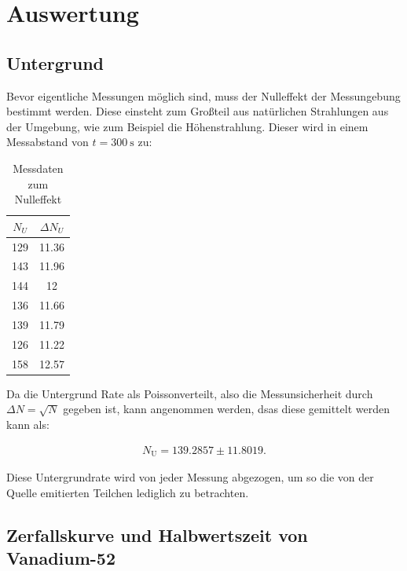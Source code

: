 \newpage
    \section{Auswertung}
    \subsection{Untergrund}
    Bevor eigentliche Messungen möglich sind, muss der Nulleffekt der Messungebung bestimmt werden. Diese einsteht zum Großteil aus natürlichen Strahlungen aus der Umgebung, wie zum Beispiel die Höhenstrahlung.
    Dieser wird in einem Messabstand von $t = \SI{300}{\second}$ zu:
    \begin{table}
	\centering
	\caption{Messdaten zum Nulleffekt}
	\label{tab:untergrundrate}
	\begin{tabular}{c c}
		\toprule
		$N_U$ & $\Delta N_U$ \\
		\midrule
		129 & 11.36 \\
		143 & 11.96 \\
		144 & 12 \\
		136 & 11.66 \\
		139 & 11.79 \\
		126 & 11.22 \\
		158 & 12.57 \\
		\bottomrule
	\end{tabular}
\end{table}
    Da die Untergrund Rate als Poissonverteilt, also die Messunsicherheit durch $\Delta N = \sqrt{N}$  gegeben ist, kann angenommen werden, dsas diese gemittelt werden kann als:

    \begin{align*}
    N_\text{U} = 139.2857 \pm 11.8019.
    \end{align*}

    Diese Untergrundrate wird von jeder Messung abgezogen, um so die von der Quelle emitierten Teilchen lediglich zu betrachten.

    \subsection{Zerfallskurve und Halbwertszeit von Vanadium-52}
    \label{sec:vana}

